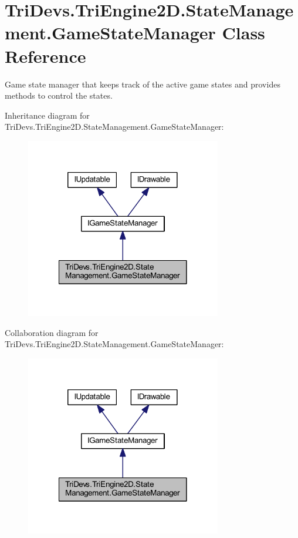 \hypertarget{class_tri_devs_1_1_tri_engine2_d_1_1_state_management_1_1_game_state_manager}{\section{Tri\-Devs.\-Tri\-Engine2\-D.\-State\-Management.\-Game\-State\-Manager Class Reference}
\label{class_tri_devs_1_1_tri_engine2_d_1_1_state_management_1_1_game_state_manager}
}


Game state manager that keeps track of the active game states and provides methods to control the states.  




Inheritance diagram for Tri\-Devs.\-Tri\-Engine2\-D.\-State\-Management.\-Game\-State\-Manager\-:\nopagebreak
\begin{figure}[H]
\begin{center}
\leavevmode
\includegraphics[width=242pt]{class_tri_devs_1_1_tri_engine2_d_1_1_state_management_1_1_game_state_manager__inherit__graph}
\end{center}
\end{figure}


Collaboration diagram for Tri\-Devs.\-Tri\-Engine2\-D.\-State\-Management.\-Game\-State\-Manager\-:\nopagebreak
\begin{figure}[H]
\begin{center}
\leavevmode
\includegraphics[width=242pt]{class_tri_devs_1_1_tri_engine2_d_1_1_state_management_1_1_game_state_manager__coll__graph}
\end{center}
\end{figure}
